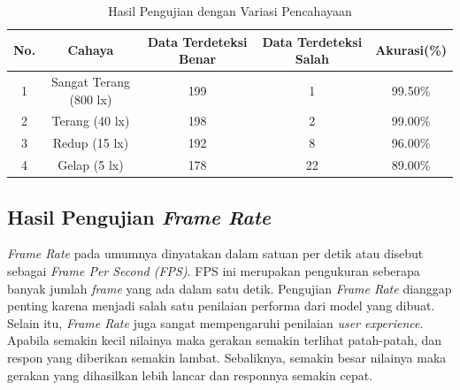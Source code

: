\hfill \break

\begin{longtable}{|c|c|c|c|c|}
  \caption{Hasil Pengujian dengan Variasi Pencahayaan}
  \label{tb:Hasil Pengujian dengan Variasi Pencahayaan}\\
  \hline
  \rowcolor[HTML]{FFFFFF}
  \textbf{No.} & \textbf{Cahaya} & \textbf{Data Terdeteksi Benar} & \textbf{Data Terdeteksi Salah} & \textbf{Akurasi(\%)} \\
  \hline
  1 & Sangat Terang (800 lx)  & 199 & 1 & 99.50\%  \\
  2 & Terang (40 lx)  & 198 & 2 & 99.00\%  \\
  3 & Redup (15 lx)   & 192 & 8 & 96.00\%  \\
  4 & Gelap (5 lx)    & 178 & 22 & 89.00\%  \\
  \hline
\end{longtable}


\subsection{Hasil Pengujian \emph{Frame Rate}}
\label{subsec:Hasil Pengujian Frame Rate}

\emph{Frame Rate} pada umumnya dinyatakan dalam satuan per detik atau disebut sebagai \emph{Frame Per Second (FPS)}. FPS ini merupakan pengukuran seberapa banyak jumlah \emph{frame} yang ada dalam satu detik. Pengujian \emph{Frame Rate} dianggap penting karena menjadi salah satu penilaian performa dari model yang dibuat. Selain itu, \emph{Frame Rate} juga sangat mempengaruhi penilaian \emph{user experience}. Apabila semakin kecil nilainya maka gerakan semakin terlihat patah-patah, dan respon yang diberikan semakin lambat. Sebaliknya, semakin besar nilainya maka  gerakan yang dihasilkan lebih lancar dan responnya semakin cepat.


